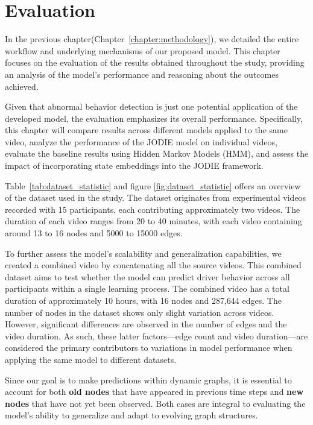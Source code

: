 \chapter{Evaluation}\label{chapter:evaluation}

In the previous chapter(Chapter~\ref{chapter:methodology}), we detailed the entire workflow and underlying mechanisms of our proposed model. This chapter focuses on the evaluation of the results obtained throughout the study, providing an analysis of the model's performance and reasoning about the outcomes achieved.

Given that abnormal behavior detection is just one potential application of the developed model, the evaluation emphasizes its overall performance. Specifically, this chapter will compare results across different models applied to the same video, analyze the performance of the JODIE model on individual videos, evaluate the baseline results using Hidden Markov Models (HMM), and assess the impact of incorporating state embeddings into the JODIE framework.

Table~\ref{tab:dataset_statistic} and figure \ref{fig:dataset_statistic} offers an overview of the dataset used in the study. The dataset originates from experimental videos recorded with 15 participants, each contributing approximately two videos. The duration of each video ranges from 20 to 40 minutes, with each video containing around 13 to 16 nodes and 5000 to 15000 edges.

To further assess the model's scalability and generalization capabilities, we created a combined video by concatenating all the source videos. This combined dataset aims to test whether the model can predict driver behavior across all participants within a single learning process. The combined video has a total duration of approximately 10 hours, with 16 nodes and 287,644 edges. The number of nodes in the dataset shows only slight variation across videos. However, significant differences are observed in the number of edges and the video duration. As such, these latter factors—edge count and video duration—are considered the primary contributors to variations in model performance when applying the same model to different datasets.

Since our goal is to make predictions within dynamic graphs, it is essential to account for both \textbf{old nodes} that have appeared in previous time steps and \textbf{new nodes} that have not yet been observed. Both cases are integral to evaluating the model’s ability to generalize and adapt to evolving graph structures.

